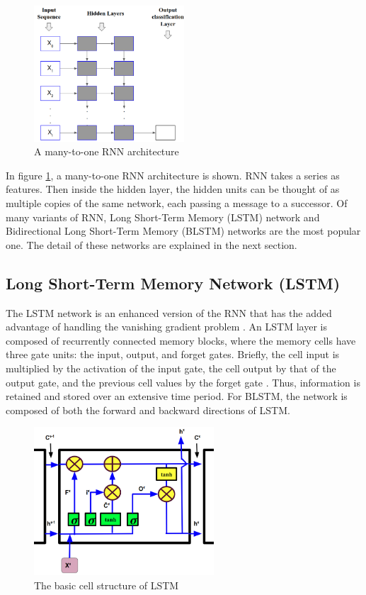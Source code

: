 \begin{figure}
\centering
   \includegraphics[width=0.5\textwidth]{Chapters/RNN.png}
\caption[A many-to-one RNN architecture]{A many-to-one RNN architecture }
\label{fig:RNN}
\end{figure}

In figure \ref{fig:RNN}, a many-to-one RNN architecture is shown. RNN takes a series as features. Then inside the hidden layer, the hidden units can be thought of as multiple copies of the same network, each passing a message to a successor. Of many variants of RNN, Long Short-Term Memory (LSTM) network and Bidirectional Long Short-Term Memory (BLSTM) networks are the most popular one. The detail of these networks are explained in the next section.

\subsection{Long Short-Term Memory Network (LSTM)}
\label{LSTM}

The LSTM network is an enhanced version of the RNN that has the added advantage of handling the vanishing gradient problem \cite{LSTM}. An LSTM layer is composed of recurrently connected memory blocks, where the memory cells have three gate units: the input, output, and forget gates. Briefly, the cell input is multiplied by the activation of the input gate, the cell output by that of the output gate, and
the previous cell values by the forget gate \cite{Meta}. Thus, information is retained and stored over an extensive time period. For BLSTM, the network is composed of both the forward and backward directions of LSTM. 

\begin{figure}
\centering
   \includegraphics[width=0.6\textwidth]{Chapters/cell_LSTM.png}
\caption[The basic cell structure of LSTM]{The basic cell structure of LSTM }
\label{fig:LSTM}
\end{figure}


